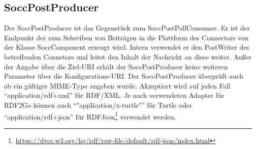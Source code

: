 
\subsection{SoccPostProducer} %
\label{sub:soccpostproducer}

Der SoccPostProducer ist das Gegenstück zum SoccPostPollConsumer. Er ist der Endpunkt der zum Schreiben von Beiträgen in die Plattform des Connectors von der Klasse SoccComponent erzeugt wird. Intern verwendet er den PostWriter des betreffenden Connetors und leitet den Inhalt der Nachricht an diese weiter. Außer der Angabe über die Ziel-URI erhält der SoccPostProducer keine weiteren Parameter über die Konfigurations-URI. Der SoccPostProducer überprüft auch ob ein gültiger MIME-Type angeben wurde. Akzeptiert wird auf jeden Fall \enquote{application/rdf+xml} für RDF/XML. Je nach verwendeten Adapter für RDF2Go können auch \enquote{"application/x-turtle"} für Turtle oder \enquote{application/rdf+json} für RDFJson\footnote{\url{https://dvcs.w3.org/hg/rdf/raw-file/default/rdf-json/index.html}} verwendet werden.



